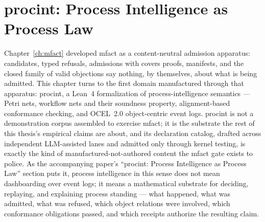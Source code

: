 \chapter{procint: Process Intelligence as Process Law}
\label{ch:procint}
\label{sec:procint}

Chapter~\ref{ch:mfact} developed \textsf{mfact} as a content-neutral
admission apparatus: candidates, typed refusals, admissions with covers
proofs, manifests, and the closed family of valid objections say nothing,
by themselves, about what is being admitted. This chapter turns to the
first domain manufactured through that apparatus: \textsf{procint}, a
Lean~4 formalization of process-intelligence semantics --- Petri nets,
workflow nets and their soundness property, alignment-based conformance
checking, and OCEL~2.0 object-centric event logs. \textsf{procint} is not
a demonstration corpus assembled to exercise \textsf{mfact}; it is the
substrate the rest of this thesis's empirical claims are about, and its
declaration catalog, drafted across independent LLM-assisted lanes and
admitted only through kernel testing, is exactly the kind of
manufactured-not-authored content the mfact gate exists to police. As
the accompanying paper's ``procint: Process Intelligence as Process Law''
section puts it, process
intelligence in this sense does not mean dashboarding over event logs; it
means a mathematical substrate for deciding, replaying, and explaining
process standing --- what happened, what was admitted, what was refused,
which object relations were involved, which conformance obligations
passed, and which receipts authorize the resulting claim.

